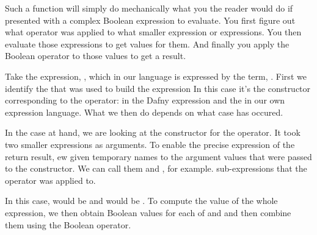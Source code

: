 \documentclass[letterpaper,10pt,english]{sphinxmanual}
\begin{document}
Such a function will simply do mechanically what you the reader would
do if presented with a complex Boolean expression to evaluate.  You
first figure out what operator was applied to what smaller expression
or expressions. You then evaluate those expressions to get values for
them. And finally you apply the Boolean operator to those values to
get a result.

Take the expression, , which in our
language is expressed by the term, . First we identify the  that was used to build
the expression In this case it’s the constructor corresponding to the
 operator: \sphinxstyleemphasis{\&\&} in the Dafny expression and the  in our own
expression language. What we then do depends on what case has occured.

In the case at hand, we are looking at the constructor for the 
operator. It took two smaller expressions as arguments. To enable the
precise expression of the return result, ew given temporary names to
the argument values that were passed to the constructor. We can call
them  and , for example.
sub-expressions that the operator was applied to.

In this case,  would be  and  would be . To compute the value of the whole expression, we then obtain
Boolean values for each of  and  and then combine them using
the Boolean  operator.
\end{document}
